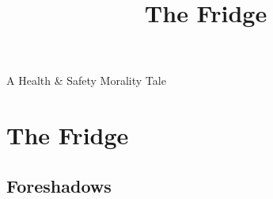 \documentclass[a4paper,openany]{book}
\title{The \Glsfmttext{ftown} Fridge}
\begin{document}
%
  {A Health \& Safety Morality Tale}%

\glsunsetall


\printglossary[
  style=topicmcols,
  ]

\printglossary[
  type=mech,
  style=topicmcols,
  ]

\mainmatter
\glsresetall

\chapter{The Fridge}

\section{Foreshadows}

\begin{multicols}{2}
  
\end{multicols}

\stopcontents[segments]



\backmatter
\end{document}
